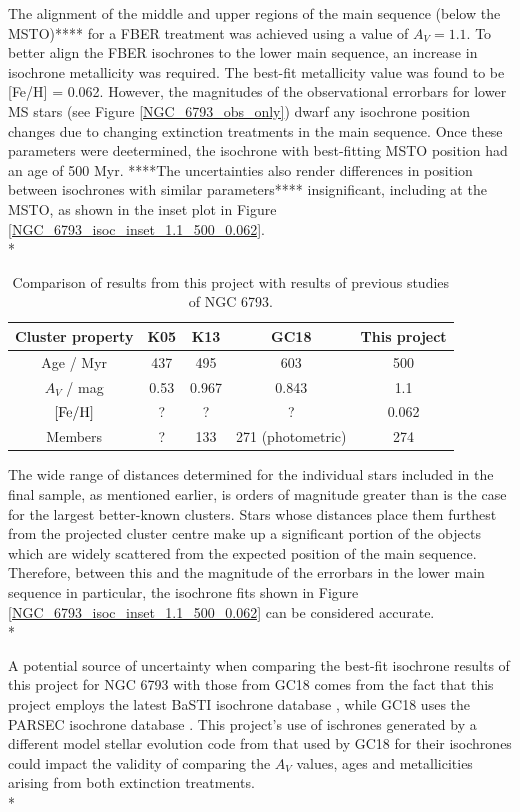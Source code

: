\documentclass[12pt, a4paper]{report}
\begin{document}
The alignment of the middle and upper regions of the main sequence (below the MSTO)**** for a FBER treatment was achieved using a value of $A_{V} = 1.1$. To better align the FBER isochrones to the lower main sequence, an increase in isochrone metallicity was required. The best-fit metallicity value was found to be [Fe/H] = 0.062.  However, the magnitudes of the observational errorbars for lower MS stars (see Figure \ref{NGC_6793_obs_only}) dwarf any isochrone position changes due to changing extinction treatments in the main sequence. Once these parameters were deetermined, the isochrone with best-fitting MSTO position had an age of 500 Myr. ****The uncertainties also render differences in position between isochrones with similar parameters**** insignificant, including at the MSTO, as shown in the inset plot in Figure \ref{NGC_6793_isoc_inset_1.1_500_0.062}.\\*


\begin{table}
\begin{center}
\begin{tabular}{ccccc}
\hline
Cluster property & K05 & K13 & GC18 & This project \\
\hline
Age / Myr & 437 & 495 & 603 & 500 \\
$A_{V}$ / mag & 0.53 & 0.967 & 0.843 & 1.1 \\
$\textnormal{[Fe/H]}$ & ? & ? & ? & 0.062 \\
Members & ? & 133 & 271 (photometric) & 274 \\
\hline
\end{tabular}
\caption{Comparison of results from this project with results of previous studies of NGC 6793.}
\label{NGC6793_result}
\end{center}
\end{table}

The wide range of distances determined for the individual stars included in the final sample, as mentioned earlier, is orders of magnitude greater than is the case for the largest better-known clusters. Stars whose distances place them furthest from the projected cluster centre make up a significant portion of the objects which are widely scattered from the expected position of the main sequence. Therefore, between this and the magnitude of the errorbars in the lower main sequence in particular, the isochrone fits shown in Figure \ref{NGC_6793_isoc_inset_1.1_500_0.062} can be considered accurate. \\*

A potential source of uncertainty when comparing the best-fit isochrone results of this project for NGC 6793 with those from GC18 comes from the fact that this project employs the latest BaSTI isochrone database \citep{2018ApJ...856..125H}, while GC18 uses the PARSEC isochrone database \citep{2017ApJ...835...77M}. This project's use of ischrones generated by a different model stellar evolution code from that used by GC18 for their isochrones could impact the validity of comparing the $A_{V}$ values, ages and metallicities arising from both extinction treatments.\\*
\end{document}
